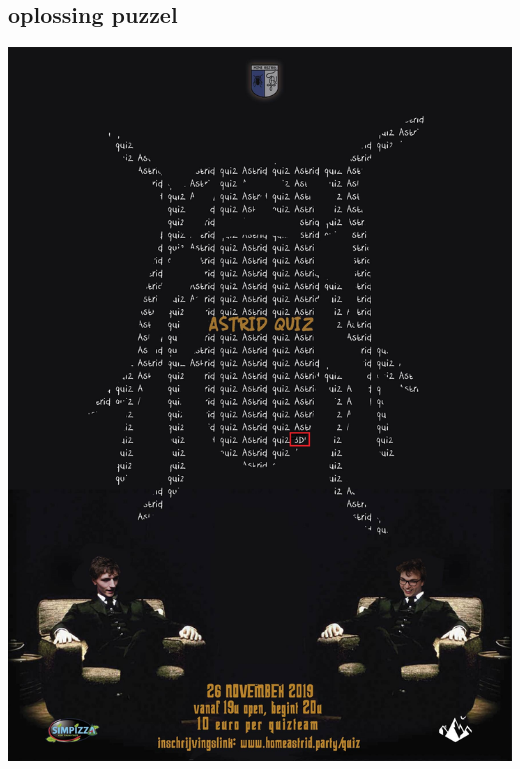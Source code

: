 \documentclass{exam}
\begin{document}
\begin{appendices}
\section{oplossing puzzel}
\begin{center}
\includegraphics[scale=0.35]{quiz}
\end{center}
\end{appendices}
\end{document}
